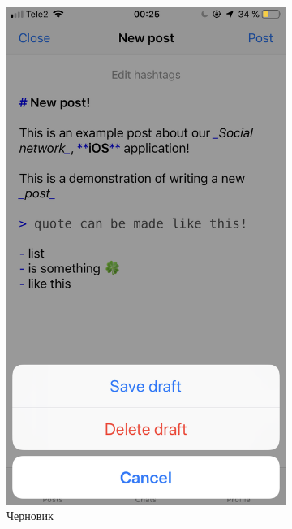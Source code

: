 \documentclass[a4paper,12pt]{article}
\begin{document}
\begin{figure}[h!]
\begin{subfigure}[b]{0.3\linewidth}
			\includegraphics[width=\linewidth]{../includes/ro/draft.png}
			\caption{\label{pic: draft}Черновик}
		\end{subfigure}
		\begin{subfigure}[b]{0.3\linewidth}

\end{subfigure}
\end{figure}
\end{document}
